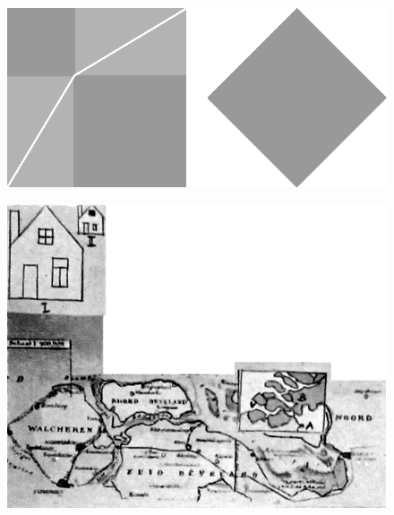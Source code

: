 \begin{figure}[H]
\centering
\includegraphics[scale=.9]{figure/fig_28.eps}
\caption{}\label{chap6-fig28}
\end{figure}

\begin{figure}[H]
\centering
\includegraphics[scale=.8]{figure/fig_29.eps}
\caption{}\label{chap6-fig29}
\end{figure}

